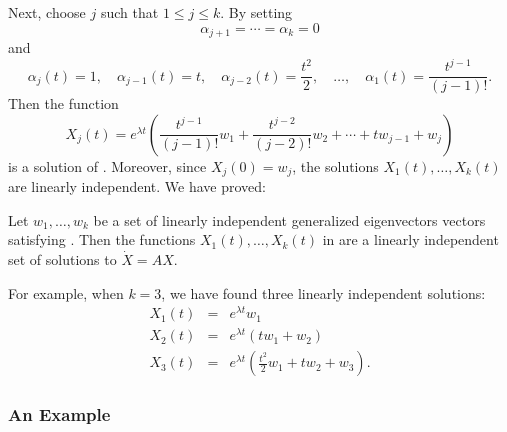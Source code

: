 Next, choose $j$ such that $1\le j\le k$.  By setting
\[ 
\alpha_{j+1} =  \cdots = \alpha_k = 0
\]
and 
\[
\alpha_j(t)=1, \quad \alpha_{j-1}(t)=t, \quad \alpha_{j-2}(t)=\frac{t^2}{2},
\quad \ldots, \quad\alpha_1(t)=\frac{t^{j-1}}{(j-1)!}.
\]
Then the function 
\begin{equation}  \label{E:Xj}
X_j(t)=e^{\lambda t} \left(\frac{t^{j-1}}{(j-1)!}w_1+\frac{t^{j-2}}{(j-2)!}w_2
+\cdots+tw_{j-1}+w_j\right)
\end{equation}
is a solution of .   Moreover, since $X_j(0)=w_j$, the 
solutions $X_1(t),\ldots,X_k(t)$ are linearly independent.  We have proved:
\begin{thm}  \label{T:JBsoln}
Let $w_1,\ldots,w_k$ be a set of linearly independent generalized
eigenvectors vectors satisfying . Then the functions 
$X_1(t),\ldots,X_k(t)$ in  are a linearly independent set of 
solutions to $\dot{X}=AX$.
\end{thm}

For example, when $k=3$, we have found three linearly independent solutions:
\begin{eqnarray*}
X_1(t)&=&e^{\lambda t} w_1\\
X_2(t)&=&e^{\lambda t} (tw_1+w_2)\\
X_3(t)&=&e^{\lambda t} \left(\frac{t^2}{2}w_1+tw_2+w_3\right).
\end{eqnarray*}


\subsubsection*{An Example}

